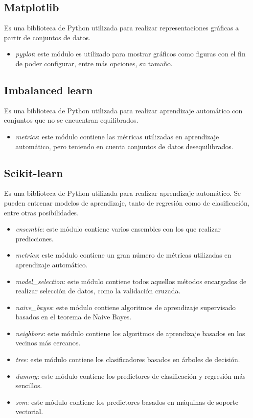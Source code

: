 \subsection{Matplotlib}
Es una biblioteca de Python utilizada para realizar representaciones gráficas a partir de conjuntos de datos.
\begin{itemize}
	\item \textit{pyplot}: este módulo es utilizado para mostrar gráficos como figuras con el fin de poder configurar, entre más opciones, su tamaño. \cite{plt}
\end{itemize}

\subsection{Imbalanced learn}
Es una biblioteca de Python utilizada para realizar aprendizaje automático con conjuntos que no se encuentran equilibrados.
\begin{itemize}
	\item \textit{metrics}: este módulo contiene las métricas utilizadas en aprendizaje automático, pero teniendo en cuenta conjuntos de datos desequilibrados. \cite{imblearn}
\end{itemize}

\subsection{Scikit-learn}
Es una biblioteca de Python utilizada para realizar aprendizaje automático. Se pueden entrenar modelos de aprendizaje, tanto de regresión como de clasificación, entre otras posibilidades.
\begin{itemize}
	\item \textit{ensemble}: este módulo contiene varios ensembles con los que realizar predicciones. \cite{skensemble}
	\item \textit{metrics}: este módulo contiene un gran número de métricas utilizadas en aprendizaje automático. \cite{skmetrics}
	\item \textit{model\_selection}: este módulo contiene todos aquellos métodos encargados de realizar selección de datos, como la validación cruzada. \cite{skmodsel}
	\item \textit{naive\_bayes}: este módulo contiene algoritmos de aprendizaje supervisado basados en el teorema de Naive Bayes. \cite{sknbayes}
	\item \textit{neighbors}: este módulo contiene los algoritmos de aprendizaje basados en los vecinos más cercanos. \cite{skneighbors}
	\item \textit{tree}: este módulo contiene los clasificadores basados en árboles de decisión. \cite{sktree}
	\item \textit{dummy}: este módulo contiene los predictores de clasificación y regresión más sencillos.
	\item \textit{svm}: este módulo contiene los predictores basados en máquinas de soporte vectorial. \cite{sksvm}
\end{itemize}

